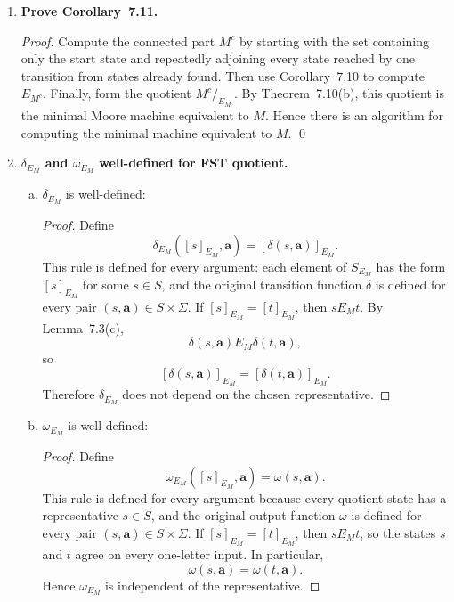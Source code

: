 \begin{enumerate}[{7.}1.]
\item \textbf{Prove Corollary~7.11.}

\begin{proof}
Compute the connected part $M^c$ by starting with the set containing only the
start state and repeatedly adjoining every state reached by one transition from
states already found.  Then use
Corollary~7.10 to compute $E_{M^c}$.  Finally, form the quotient
$M^c/_{E_{M^c}}$.  By Theorem~7.10(b), this quotient is the minimal Moore
machine equivalent to $M$.  Hence there is an algorithm for computing the
minimal machine equivalent to $M$. \qed
\end{proof}

\item \textbf{$\delta_{E_M}$ and $\omega_{E_M}$ well-defined for FST quotient.}

\begin{enumerate}[(a)]
  \item $\delta_{E_M}$ is well-defined:

  \begin{proof}
  Define
  \[
    \delta_{E_M}([s]_{E_M},\pmb{a})=[\delta(s,\pmb{a})]_{E_M}.
  \]
  This rule is defined for every argument: each element of $S_{E_M}$ has the
  form $[s]_{E_M}$ for some $s\in S$, and the original transition function
  $\delta$ is defined for every pair $(s,\pmb{a})\in S\times\Sigma$.
  If $[s]_{E_M}=[t]_{E_M}$, then $s E_M t$.  By Lemma~7.3(c),
  \[
    \delta(s,\pmb{a}) E_M \delta(t,\pmb{a}),
  \]
  so
  \[
    [\delta(s,\pmb{a})]_{E_M}=[\delta(t,\pmb{a})]_{E_M}.
  \]
  Therefore $\delta_{E_M}$ does not depend on the chosen representative.
  \end{proof}

  \item $\omega_{E_M}$ is well-defined:

  \begin{proof}
  Define
  \[
    \omega_{E_M}([s]_{E_M},\pmb{a})=\omega(s,\pmb{a}).
  \]
  This rule is defined for every argument because every quotient state has a
  representative $s\in S$, and the original output function $\omega$ is defined
  for every pair $(s,\pmb{a})\in S\times\Sigma$.
  If $[s]_{E_M}=[t]_{E_M}$, then $s E_M t$, so the states $s$ and $t$ agree on
  every one-letter input.  In particular,
  \[
    \omega(s,\pmb{a})=\omega(t,\pmb{a}).
  \]
  Hence $\omega_{E_M}$ is independent of the representative.
  \end{proof}
\end{enumerate}


\end{enumerate}
